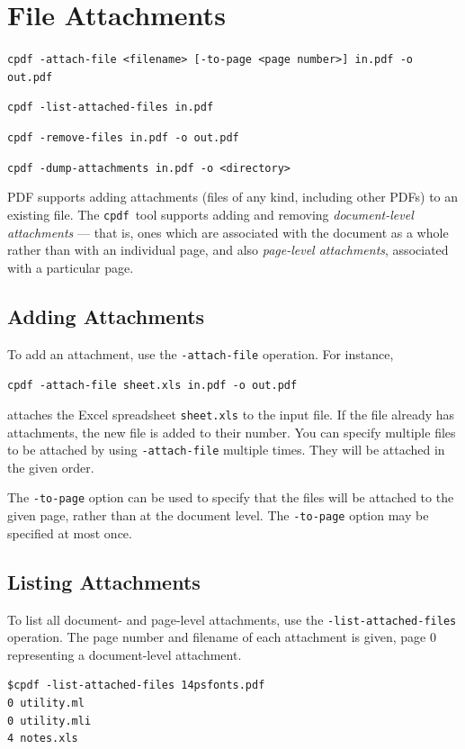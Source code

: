 \documentclass{book}
\newcommand{\cpdf}{\texttt{cpdf}}
\begin{document}
\chapter{File Attachments}\label{chap:12}\pagestyle{fancy}
\begin{framed}
  \small\noindent\verb!cpdf -attach-file <filename> [-to-page <page number>] in.pdf -o out.pdf!

  \vspace{1.5mm}
  \small\noindent\verb!cpdf -list-attached-files in.pdf!
 
  \vspace{1.5mm}
  \small\noindent\verb!cpdf -remove-files in.pdf -o out.pdf!

  \vspace{1.5mm}
  \small\noindent\verb!cpdf -dump-attachments in.pdf -o <directory>!
\end{framed}
  PDF supports adding attachments (files of any kind, including other PDFs) to
an existing file. The \cpdf\ tool supports adding and removing \textit{document-level
attachments} --- that is, ones which are associated with the document as a
whole rather than with an individual page, and also \textit{page-level attachments}, associated with a particular page.
  \section{Adding Attachments}
  To add an attachment, use the \texttt{-attach-file} operation. For instance,
  \begin{framed}
  \noindent\small\verb!cpdf -attach-file sheet.xls in.pdf -o out.pdf!
  \end{framed}
  \noindent attaches the Excel spreadsheet \texttt{sheet.xls} to the input file. If the file already has attachments, the new file is added to their number. You can specify multiple files to be attached by using \verb!-attach-file! multiple times. They will be attached in the given order.
  
  The \texttt{-to-page} option can be used to specify that the files will be attached to the given page, rather than at the document level. The \texttt{-to-page} option may be specified at most once. 

\section{Listing Attachments}
To list all document- and page-level attachments, use the \texttt{-list-attached-files} operation. The page number and filename of each attachment is given, page 0 representing a document-level attachment.
\begin{framed}
{\small\begin{verbatim}
$cpdf -list-attached-files 14psfonts.pdf
0 utility.ml
0 utility.mli
4 notes.xls
\end{verbatim}}
\end{framed}
\end{document}
